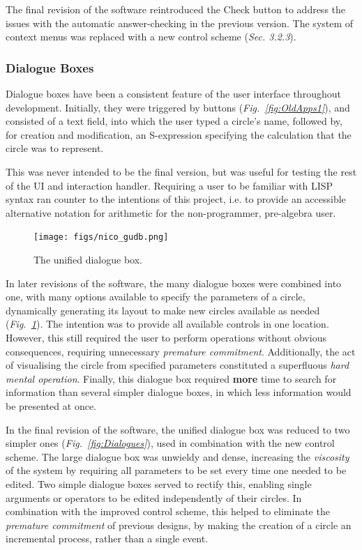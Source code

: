 \documentclass[12pt,twoside,notitlepage,xetex]{report}
\begin{document}
The final revision of the software reintroduced the {\sfapp Check} button to address the issues with the automatic answer-checking in the previous version.  The system of context menus was replaced with a new control scheme (\emph{Sec. 3.2.3}).

\subsubsection{Dialogue Boxes}

Dialogue boxes have been a consistent feature of the user interface throughout development.  Initially, they were triggered by buttons (\emph{Fig.~\ref{fig:OldApps1}}), and consisted of a text field, into which the user typed a circle's name, followed by, for creation and modification, an S-expression specifying the calculation that the circle was to represent.

This was never intended to be the final version, but was useful for testing the rest of the UI and interaction handler.  Requiring a user to be familiar with LISP syntax ran counter to the intentions of this project, i.e. to provide an accessible alternative notation for arithmetic for the non-programmer, pre-algebra user.

\begin{center}
\begin{figure}[H]
\begin{center}
\texttt{[image: figs/nico\_gudb.png]}
\end{center}
\caption{The unified dialogue box.}
\label{fig:GUDB}
\end{figure}
\end{center}

In later revisions of the software, the many dialogue boxes were combined into one, with many options available to specify the parameters of a circle, dynamically generating its layout to make new circles available as needed (\emph{Fig.~\ref{fig:GUDB}}).  The intention was to provide all available controls in one location.  However, this still required the user to perform operations without obvious consequences, requiring unnecessary \emph{premature commitment}.  Additionally, the act of visualising the circle from specified parameters constituted a superfluous \emph{hard mental operation}.  Finally, this dialogue box required {\bf more} time to search for information than several simpler dialogue boxes, in which less information would be presented at once.

In the final revision of the software, the unified dialogue box was reduced to two simpler ones (\emph{Fig.~\ref{fig:Dialogues}}), used in combination with the new control scheme.  The large dialogue box was unwieldy and dense, increasing the \emph{viscosity} of the system by requiring all parameters to be set every time one needed to be edited.  Two simple dialogue boxes served to rectify this, enabling single arguments or operators to be edited independently of their circles.  In combination with the improved control scheme, this helped to eliminate the \emph{premature commitment} of previous designs, by making the creation of a circle an incremental process, rather than a single event.
\end{document}
